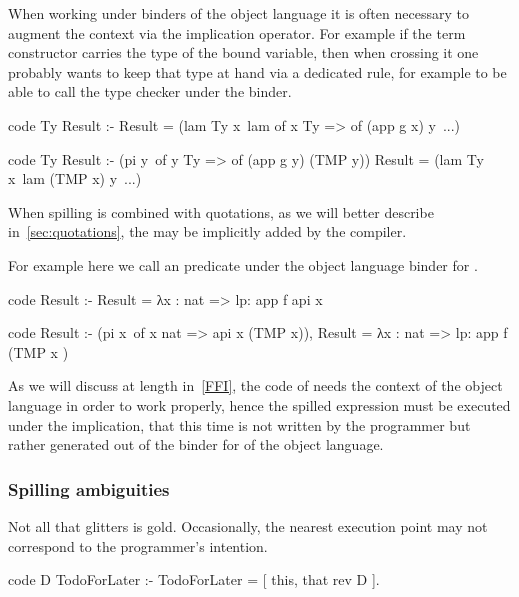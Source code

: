 \documentclass[a4paper, 11pt]{book}
\begin{document}
When working under binders of the object language it is often
necessary to augment the context via
the implication operator. For example if the 
term constructor carries the type of the bound variable, then when
crossing it one probably wants to keep that type at hand via
a dedicated rule, for example to be able to call the type
checker under the binder.

\begin{elpicode}
  code Ty Result :- 
    Result = (lam Ty x\ lam {of x Ty => of (app g x)} y\ ...)

  code Ty Result :-
    (pi y\ of y Ty => of (app g y) (TMP y))
    Result = (lam Ty x\ lam (TMP x) y\ ...)
\end{elpicode}

\noindent
When spilling is combined with quotations, as we
will better describe in~\cref{sec:quotations},
the \elpi{=>} may be implicitly added by the compiler.

For example
here we call an predicate  under the object language binder
for .

\begin{elpicode}
  code Result :-
    Result = {{ λx : nat => lp:{{ app f {api x}  }}  }}

  code Result :-
    (pi x\ of x {{ nat }} => api x (TMP x)),
    Result = {{ λx : nat => lp:{{ app f (TMP {{ x }})  }}  }}
\end{elpicode}

\noindent
As we will discuss at length in~\cref{FFI}, the code of  needs the
context of the object language in order to work properly, hence the
spilled expression must be executed under the implication, that this time
is not written by the programmer but rather generated out of the binder
for  of the object language.

\subsubsection{Spilling ambiguities}

Not all that glitters is gold. Occasionally, the nearest execution point may not
correspond to the programmer's intention.

\begin{elpicode}
  code D TodoForLater  :-
    TodoForLater = [ this, that {rev D} ].
\end{elpicode}
\end{document}
